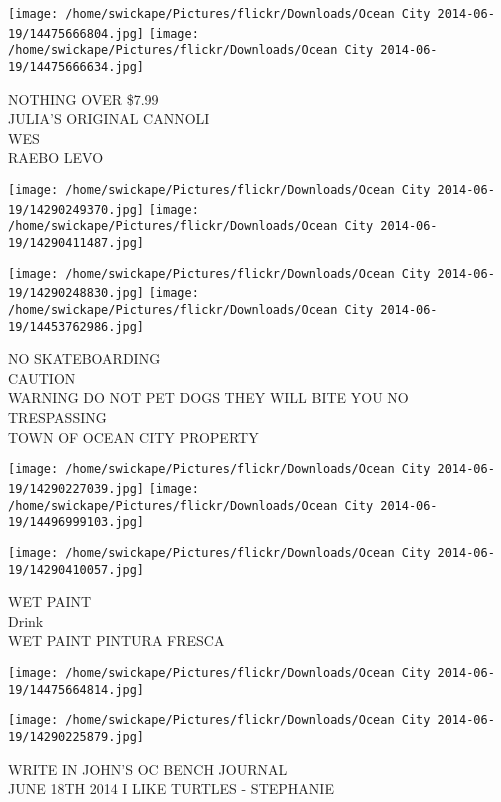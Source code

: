 \documentclass[10pt,letterpaper]{article}
\begin{document}
\texttt{[image: /home/swickape/Pictures/flickr/Downloads/Ocean City 2014-06-19/14475666804.jpg]}
\texttt{[image: /home/swickape/Pictures/flickr/Downloads/Ocean City 2014-06-19/14475666634.jpg]}

NOTHING OVER \$7.99\\
JULIA'S ORIGINAL CANNOLI\\
WES\\
RAEBO LEVO\\
\pagebreak

\texttt{[image: /home/swickape/Pictures/flickr/Downloads/Ocean City 2014-06-19/14290249370.jpg]}
\texttt{[image: /home/swickape/Pictures/flickr/Downloads/Ocean City 2014-06-19/14290411487.jpg]}

\texttt{[image: /home/swickape/Pictures/flickr/Downloads/Ocean City 2014-06-19/14290248830.jpg]}
\texttt{[image: /home/swickape/Pictures/flickr/Downloads/Ocean City 2014-06-19/14453762986.jpg]}

NO SKATEBOARDING\\
CAUTION\\
WARNING DO NOT PET DOGS THEY WILL BITE YOU NO TRESPASSING\\
TOWN OF OCEAN CITY PROPERTY\\
\pagebreak

\texttt{[image: /home/swickape/Pictures/flickr/Downloads/Ocean City 2014-06-19/14290227039.jpg]}
\texttt{[image: /home/swickape/Pictures/flickr/Downloads/Ocean City 2014-06-19/14496999103.jpg]}

\texttt{[image: /home/swickape/Pictures/flickr/Downloads/Ocean City 2014-06-19/14290410057.jpg]}

WET PAINT\\
Drink\\
WET PAINT PINTURA FRESCA\\
\pagebreak

\texttt{[image: /home/swickape/Pictures/flickr/Downloads/Ocean City 2014-06-19/14475664814.jpg]}

\vspace{0.25in}
\texttt{[image: /home/swickape/Pictures/flickr/Downloads/Ocean City 2014-06-19/14290225879.jpg]}

WRITE IN JOHN'S OC BENCH JOURNAL\\
JUNE 18TH 2014 I LIKE TURTLES {-} STEPHANIE\\
\pagebreak
\end{document}
